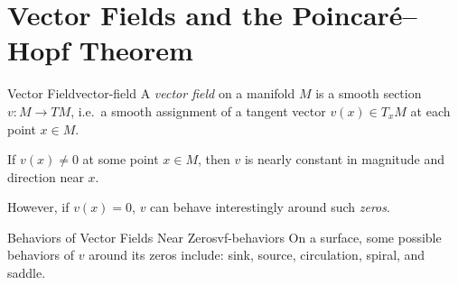 
\section{Vector Fields and the Poincar\'e--Hopf Theorem}

\begin{definition}{Vector Field}{vector-field}
    A \emph{vector field} on a manifold $M$ is a smooth section $v \colon M \to TM$, i.e.\ a smooth assignment of a tangent vector $v(x) \in T_x M$ at each point $x \in M$.
\end{definition}

If $v(x) \neq 0$ at some point $x \in M$, then $v$ is nearly constant in magnitude and direction near $x$.

\begin{center}
\end{center}

However, if $v(x) = 0$, $v$ can behave interestingly around such \emph{zeros}.

\begin{example}{Behaviors of Vector Fields Near Zeros}{vf-behaviors}
    On a surface, some possible behaviors of $v$ around its zeros include: sink, source, circulation, spiral, and saddle.
\end{example}

